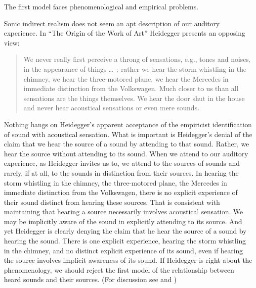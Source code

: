 \documentclass[12pt]{article}
\begin{document}
The first model faces phenomenological and empirical problems.

Sonic indirect realism does not seem an apt description of our auditory experience. In ``The Origin of the Work of Art'' Heidegger presents an opposing view:
\begin{quote}
	We never really first perceive a throng of sensations, e.g., tones and noises, in the appearance of things \ldots\ ; rather we hear the storm whistling in the chimney, we hear the three-motored plane, we hear the Mercedes in immediate distinction from the Volkswagen. Much closer to us than all sensations are the things themselves. We hear the door shut in the house and never hear acoustical sensations or even mere sounds. \citep{Heidegger:1935uq}
\end{quote}
Nothing hangs on Heidegger’s apparent acceptance of the empiricist identification of sound with acoustical sensation. What is important is Heidegger’s denial of the claim that we hear the source of a sound by attending to that sound. Rather, we hear the source without attending to its sound. When we attend to our auditory experience, as Heidegger invites us to, we attend to the sources of sounds and rarely, if at all, to the sounds in distinction from their sources. In hearing the storm whistling in the chimney, the three-motored plane, the Mercedes in immediate distinction from the Volkswagen, there is no explicit experience of their sound distinct from hearing these sources. That is consistent with maintaining that hearing a source necessarily involves acoustical sensation. We may be implicitly aware of the sound in explicitly attending to its source. And yet Heidegger is clearly denying the claim that he hear the source of a sound by hearing the sound. There is one explicit experience, hearing the storm whistling in the chimney, and no distinct explicit experience of its sound, even if hearing the source involves implicit awareness of its sound. If Heidegger is right about the phenomenology, we should reject the first model of the relationship between heard sounds and their sources. (For discussion see \citealt{Leddington:2014aa} and \citealt[chapter 3]{Kalderon:2018oe})
\end{document}
